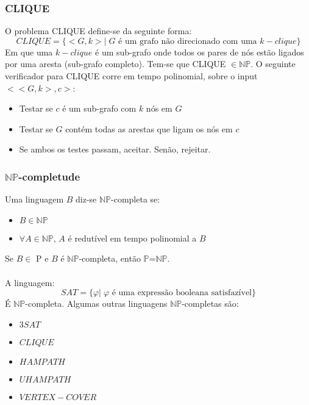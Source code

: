 \documentclass[10pt,a4paper]{report}
\begin{document}
\subsubsection{CLIQUE}
O problema CLIQUE define-se da seguinte forma:
$$
CLIQUE = \{<G,k> |\; G \text{ é um grafo não direcionado com uma } k-clique\}
$$
Em que uma $k-clique$ é um sub-grafo onde todos os pares de nós estão ligados por uma aresta (sub-grafo completo). Tem-se que CLIQUE $\in \mathbb{N}\mathbb{P}$. O seguinte verificador para CLIQUE corre em tempo polinomial, sobre o input $<<G,k>,c>$:
\begin{itemize}
\item Testar se $c$ é um sub-grafo com $k$ nós em $G$
\item Testar se $G$ contém todas as arestas que ligam os nós em $c$
\item Se ambos os testes passam, aceitar. Senão, rejeitar.
\end{itemize}
\subsubsection{$\mathbb{N}\mathbb{P}$-completude}
Uma linguagem $B$ diz-se $\mathbb{N}\mathbb{P}$-completa se:
\begin{itemize}
\item $B \in \mathbb{N}\mathbb{P}$
\item $\forall A \in \mathbb{N}\mathbb{P}$, $A$ é redutível em tempo polinomial a $B$
\end{itemize}
Se $B \in $ P e $B$ é $\mathbb{N}\mathbb{P}$-completa, então $\mathbb{P}$=$\mathbb{N}\mathbb{P}$.\\
\\
A linguagem:
$$
SAT = \{\varphi | \; \varphi \text{ é uma expressão booleana satisfazível}\}
$$
É $\mathbb{N}\mathbb{P}$-completa. Algumas outras linguagens $\mathbb{N}\mathbb{P}$-completas são:
\begin{itemize}
\item $3SAT$
\item $CLIQUE$
\item $HAMPATH$
\item $UHAMPATH$
\item $VERTEX-COVER$
\end{itemize} 
\end{document}
